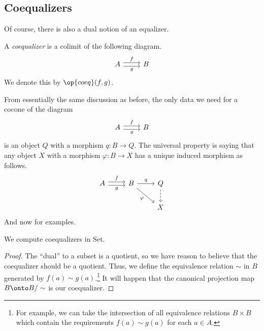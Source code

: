 \subsection{Coequalizers}
Of course, there is also a dual notion of an equalizer.
\begin{defi}[Coequalizer]
	A \textit{coequalizer} is a colimit of the following diagram.
	\[\begin{tikzcd}
		A & B
		\arrow["g"', shift right=1, from=1-1, to=1-2]
		\arrow["f", shift left=1, from=1-1, to=1-2]
	\end{tikzcd}\]
	We denote this by $\op{coeq}(f,g)$.
\end{defi}
From essentially the same discussion as before, the only data we need for a cocone of the diagram
\[\begin{tikzcd}
	A & B
	\arrow["g"', shift right=1, from=1-1, to=1-2]
	\arrow["f", shift left=1, from=1-1, to=1-2]
\end{tikzcd}\]
is an object $Q$ with a morphism $q:B\to Q$. The universal property is saying that any object $X$ with a morphism $\varphi:B\to X$ has a unique induced morphism as follows.
\[\begin{tikzcd}
	A & B & Q \\
	&& X
	\arrow["g"', shift right=1, from=1-1, to=1-2]
	\arrow["f", shift left=1, from=1-1, to=1-2]
	\arrow["q", from=1-2, to=1-3]
	\arrow[dashed, from=1-3, to=2-3]
	\arrow["\varphi"', from=1-2, to=2-3]
\end{tikzcd}\]
And now for examples.
\begin{exe}
	We compute coequalizers in $\mathrm{Set}$.
\end{exe}
\begin{proof}
	The ``dual'' to a subset is a quotient, so we have reason to believe that the coequalizer should be a quotient. Thus, we define the equivalence relation $\sim$ in $B$ generated by $f(a)\sim g(a)$.\footnote{For example, we can take the intersection of all equivalence relations $B\times B$ which contain the requirements $f(a)\sim g(a)$ for each $a\in A$.} It will happen that the canonical projection map $B\onto B/\sim$ is our coequalizer.
\end{proof}